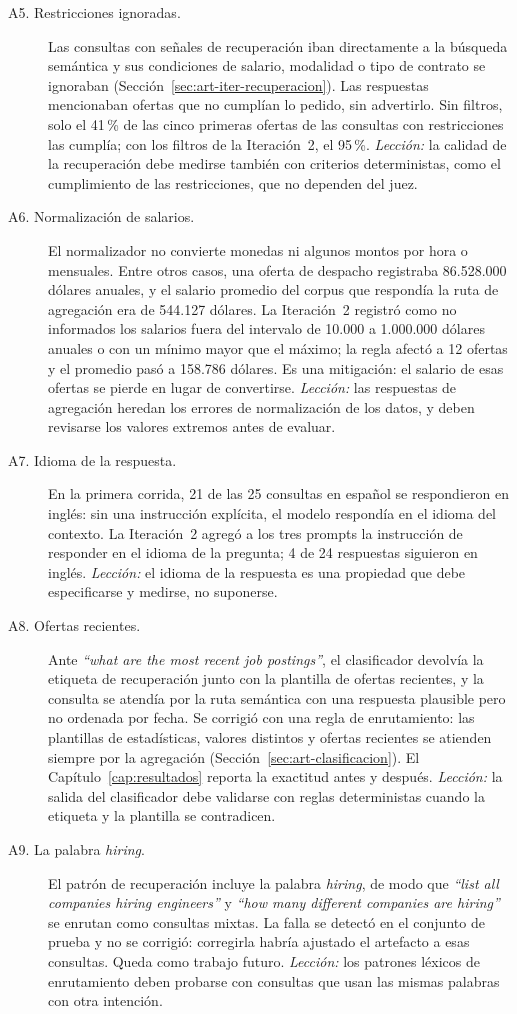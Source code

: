 \begin{description}
    \item[A5. Restricciones ignoradas.] Las consultas con señales de recuperación iban directamente a la búsqueda semántica y sus condiciones de salario, modalidad o tipo de contrato se ignoraban (Sección~\ref{sec:art-iter-recuperacion}). Las respuestas mencionaban ofertas que no cumplían lo pedido, sin advertirlo. Sin filtros, solo el 41\,\% de las cinco primeras ofertas de las consultas con restricciones las cumplía; con los filtros de la Iteración~2, el 95\,\%. \emph{Lección:} la calidad de la recuperación debe medirse también con criterios deterministas, como el cumplimiento de las restricciones, que no dependen del juez.
    \item[A6. Normalización de salarios.] El normalizador no convierte monedas ni algunos montos por hora o mensuales. Entre otros casos, una oferta de despacho registraba 86.528.000 dólares anuales, y el salario promedio del corpus que respondía la ruta de agregación era de 544.127 dólares. La Iteración~2 registró como no informados los salarios fuera del intervalo de 10.000 a 1.000.000 dólares anuales o con un mínimo mayor que el máximo; la regla afectó a 12 ofertas y el promedio pasó a 158.786 dólares. Es una mitigación: el salario de esas ofertas se pierde en lugar de convertirse. \emph{Lección:} las respuestas de agregación heredan los errores de normalización de los datos, y deben revisarse los valores extremos antes de evaluar.
    \item[A7. Idioma de la respuesta.] En la primera corrida, 21 de las 25 consultas en español se respondieron en inglés: sin una instrucción explícita, el modelo respondía en el idioma del contexto. La Iteración~2 agregó a los tres prompts la instrucción de responder en el idioma de la pregunta; 4 de 24 respuestas siguieron en inglés. \emph{Lección:} el idioma de la respuesta es una propiedad que debe especificarse y medirse, no suponerse.
    \item[A8. Ofertas recientes.] Ante \textit{\enquote{what are the most recent job postings}}, el clasificador devolvía la etiqueta de recuperación junto con la plantilla de ofertas recientes, y la consulta se atendía por la ruta semántica con una respuesta plausible pero no ordenada por fecha. Se corrigió con una regla de enrutamiento: las plantillas de estadísticas, valores distintos y ofertas recientes se atienden siempre por la agregación (Sección~\ref{sec:art-clasificacion}). El Capítulo~\ref{cap:resultados} reporta la exactitud antes y después. \emph{Lección:} la salida del clasificador debe validarse con reglas deterministas cuando la etiqueta y la plantilla se contradicen.
    \item[A9. La palabra \textit{hiring}.] El patrón de recuperación incluye la palabra \textit{hiring}, de modo que \textit{\enquote{list all companies hiring engineers}} y \textit{\enquote{how many different companies are hiring}} se enrutan como consultas mixtas. La falla se detectó en el conjunto de prueba y no se corrigió: corregirla habría ajustado el artefacto a esas consultas. Queda como trabajo futuro. \emph{Lección:} los patrones léxicos de enrutamiento deben probarse con consultas que usan las mismas palabras con otra intención.
\end{description}

